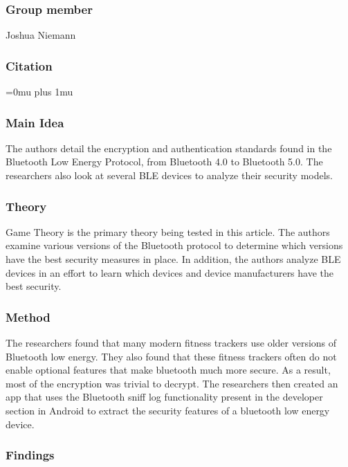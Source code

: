 \documentclass[letterpaper,12pt]{article}
\begin{document}
\noindent
\subsubsection{Group member}
Joshua Niemann

\subsubsection{Citation}

\Urlmuskip=0mu plus 1mu\relax
{}

\subsubsection{Main Idea}

\noindent
The authors detail the encryption and authentication standards found in the Bluetooth Low Energy Protocol, from Bluetooth 4.0 to Bluetooth 5.0.  The researchers also look at several BLE devices to analyze their security models.

\subsubsection{Theory}

\noindent
Game Theory is the primary theory being tested in this article.  The authors examine various versions of the Bluetooth protocol to determine which versions have the best security measures in place.  In addition, the authors analyze BLE devices in an effort to learn which devices and device manufacturers have the best security.

\subsubsection{Method}

\noindent
The researchers found that many modern fitness trackers use older versions of Bluetooth low energy.  They also found that these fitness trackers often do not enable optional features that make bluetooth much more secure.  As a result, most of the encryption was trivial to decrypt.  The researchers then created an app that uses the Bluetooth sniff log functionality present in the developer section in Android to extract the security features of a bluetooth low energy device.

\subsubsection{Findings}
\end{document}
